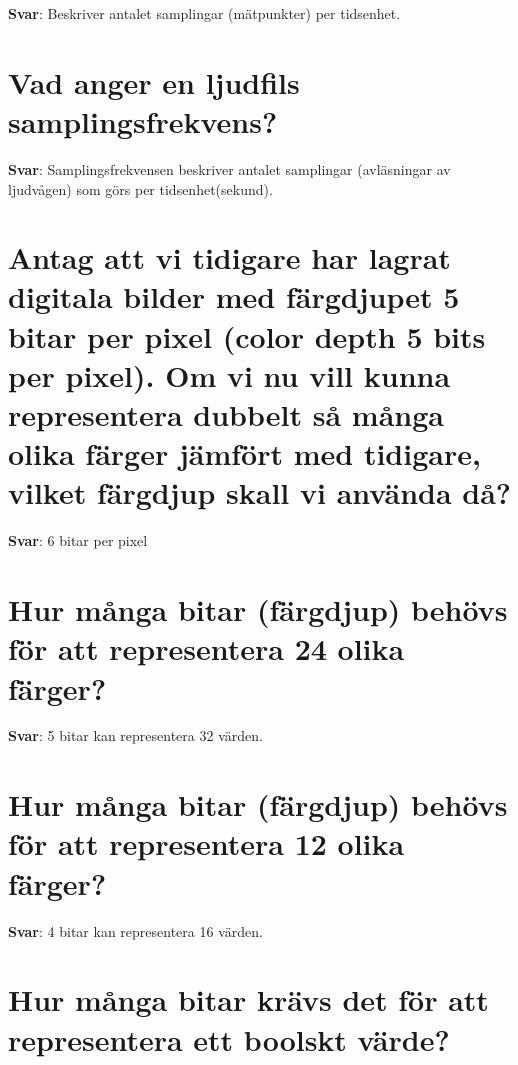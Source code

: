 \documentclass[a4paper,11pt,oneside]{book}
\begin{document}
\begin{sloppypar}
\label{q:82:sa:sv:True}

\textbf{Svar}: Beskriver antalet samplingar (m\"atpunkter) per tidsenhet.



\section{Vad anger en ljudfils samplingsfrekvens?}

\label{q:83:sa:sv:True}

\textbf{Svar}: Samplingsfrekvensen beskriver antalet samplingar (avl\"asningar av ljudv\r{a}gen) som g\"ors per tidsenhet(sekund).



\section{Antag att vi tidigare har lagrat digitala bilder med f\"argdjupet 5 bitar per pixel (color depth 5 bits per pixel). Om vi nu vill kunna representera dubbelt s\r{a} m\r{a}nga olika f\"arger j\"amf\"ort med tidigare, vilket f\"argdjup skall vi anv\"anda d\r{a}?}

\label{q:84:sa:sv:True}

\textbf{Svar}: 6 bitar per pixel



\section{Hur m\r{a}nga bitar (f\"argdjup) beh\"ovs f\"or att representera 24 olika f\"arger?}

\label{q:85:sa:sv:True}

\textbf{Svar}: 5 bitar kan representera 32 v\"arden.



\section{Hur m\r{a}nga bitar (f\"argdjup) beh\"ovs f\"or att representera 12 olika f\"arger?}

\label{q:86:sa:sv:True}

\textbf{Svar}: 4 bitar kan representera 16 v\"arden.



\section{Hur m\r{a}nga bitar kr\"avs det f\"or att representera ett boolskt v\"arde?}


\end{sloppypar}
\end{document}
